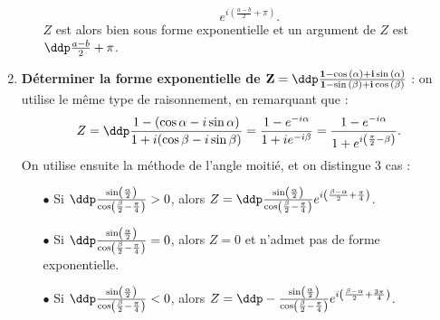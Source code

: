 \begin{correction}
\begin{enumerate}
\begin{itemize}
$$e^{i(\frac{a-b}{2}+\pi)}.$$
$Z$ est alors bien sous forme exponentielle et un argument de $Z$ est $\ddp\frac{a-b}{2}+\pi$.
\end{itemize}
\item \textbf{D\'eterminer la forme exponentielle de $\mathbf{Z=\ddp\frac{1-\cos{(\alpha)} +i\sin{(\alpha)} }{1-\sin{(\beta)} +i\cos{(\beta)}}}$} : on utilise le m\^{e}me type de raisonnement, en remarquant que :
$$Z=\ddp\frac{1-(\cos \alpha -i\sin \alpha) }{1+i(\cos \beta - i \sin \beta)} = \frac{1-e^{-i\alpha}}{1+ie^{-i\beta}} =  \frac{1-e^{-i\alpha}}{1+e^{i\left(\frac{\pi}{2} - \beta\right)}}.$$
On utilise ensuite la m\'ethode de l'angle moiti\'e, et on distingue 3 cas :
\begin{itemize}
\item[$\bullet$] Si $\ddp \frac{\sin\left(\frac{\alpha}{2}\right)}{\cos \left( \frac{\beta}{2}-\frac{\pi}{4}\right)} >0$, alors $Z = \ddp \frac{\sin\left(\frac{\alpha}{2}\right)}{\cos \left( \frac{\beta}{2}-\frac{\pi}{4}\right)} e^{i\left(\frac{\beta-\alpha}{2}+\frac{\pi}{4}\right)}$.
\item[$\bullet$] Si $\ddp \frac{\sin\left(\frac{\alpha}{2}\right)}{\cos \left( \frac{\beta}{2}-\frac{\pi}{4}\right)} =0$, alors $Z=0$ et n'admet pas de forme exponentielle.
\item[$\bullet$] Si $\ddp \frac{\sin\left(\frac{\alpha}{2}\right)}{\cos \left( \frac{\beta}{2}-\frac{\pi}{4}\right)} <0$, alors  $Z = \ddp -\frac{\sin\left(\frac{\alpha}{2}\right)}{\cos \left( \frac{\beta}{2}-\frac{\pi}{4}\right)} e^{i\left(\frac{\beta-\alpha}{2}+\frac{3\pi}{4}\right)}$.
\end{itemize}
\end{enumerate}
\end{correction}